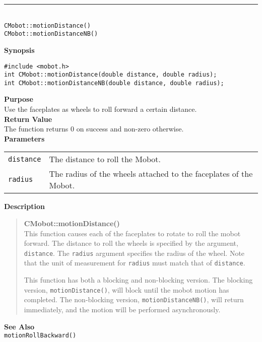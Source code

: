 \noindent
\vspace{5pt}
\rule{4.5in}{0.015in}\\
\noindent
{\LARGE \texttt{CMobot::motionDistance()}}\\
{\LARGE \texttt{CMobot::motionDistanceNB()}}\\
{}

\noindent
{\bf Synopsis}
\vspace{-8pt}
\begin{verbatim}
#include <mobot.h>
int CMobot::motionDistance(double distance, double radius);
int CMobot::motionDistanceNB(double distance, double radius);
\end{verbatim}

\noindent
{\bf Purpose}\\
Use the faceplates as wheels to roll forward a certain distance.\\

\noindent
{\bf Return Value}\\
The function returns 0 on success and non-zero otherwise.\\

\noindent
{\bf Parameters}\\
\vspace{-0.1in}
\begin{description}
\item               
\begin{tabular}{p{15 mm}p{145 mm}}
\texttt{distance} & The distance to roll the Mobot.\\
\texttt{radius} & The radius of the wheels attached to the faceplates of the Mobot.\\
\end{tabular}
\end{description}

\noindent
{\bf Description}\\
\vspace{-12pt}
\begin{quote}
{\bf CMobot::motionDistance()}\\
This function causes each of the faceplates to rotate to roll the
mobot forward. The distance to roll the wheels is specified by the argument,
\texttt{distance}. The \texttt{radius} argument specifies the radius of the wheel.
Note that the unit of measurement for \texttt{radius} must match that of
\texttt{distance}. 

This function has both a blocking and non-blocking version.
The blocking version, \texttt{motionDistance()}, will block until the
mobot motion has completed. The non-blocking version, \texttt{motionDistanceNB()},
will return immediately, and the motion will be performed asynchronously.\\
\end{quote}

\noindent
{\bf See Also}\\
\texttt{motionRollBackward()}

